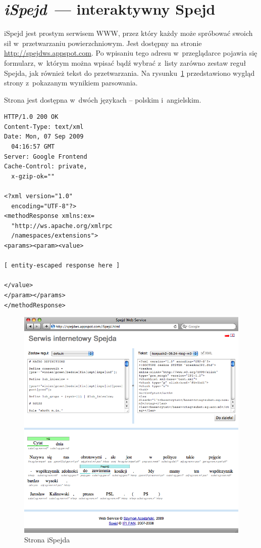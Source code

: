 \documentclass[11pt]{article}
\begin{document}
\section{\emph{iSpejd}~--- interaktywny Spejd}

iSpejd jest prostym serwisem WWW, przez który każdy może spróbować swoich sił
w~przetwarzaniu powierzchniowym. Jest dostępny na stronie
\url{http://spejdws.appspot.com}. Po wpisaniu tego adresu w~przeglądarce
pojawia się formularz, w~którym można wpisać bądź wybrać z~listy zarówno zestaw
reguł Spejda, jak również tekst do przetwarzania. Na rysunku~\ref{fig:ispejd}
przedstawiono wygląd strony z~pokazanym wynikiem parsowania.

Strona jest dostępna w~dwóch językach -- polskim i~angielskim.

\lstset{language=XML, caption=Odpowiedź serwera XML-RPC, label=lst:resp}
\begin{lstlisting}[frame=trbl]
HTTP/1.0 200 OK
Content-Type: text/xml
Date: Mon, 07 Sep 2009
  04:16:57 GMT
Server: Google Frontend
Cache-Control: private,
  x-gzip-ok=""

<?xml version="1.0"
  encoding="UTF-8"?>
<methodResponse xmlns:ex=
  "http://ws.apache.org/xmlrpc
  /namespaces/extensions">
<params><param><value>

[ entity-escaped response here ]

</value>
</param></params>
</methodResponse>
\end{lstlisting} 

\begin{figure}[htb]
  \begin{center}
    \includegraphics[width=\textwidth]{ispejd}
  \end{center}
  \caption{Strona iSpejda}
  \label{fig:ispejd}
\end{figure}
\end{document}
